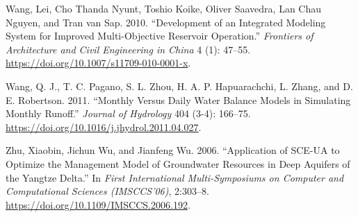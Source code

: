 \documentclass[
  letterpaper,
  DIV=11,
  numbers=noendperiod]{scrreprt}
\newlength{\cslhangindent}
\newlength{\cslentryspacingunit} %
\newenvironment{CSLReferences}[2] %
 {%
  \setlength{\parindent}{0pt}
  \ifodd #1
  \let\oldpar\par
  \def\par{\hangindent=\cslhangindent\oldpar}
  \fi
  \setlength{\parskip}{#2\cslentryspacingunit}
 }%
 {}
\begin{document}
\begin{CSLReferences}{1}{0}
\leavevmode{}%
Wang, Lei, Cho Thanda Nyunt, Toshio Koike, Oliver Saavedra, Lan Chau
Nguyen, and Tran van Sap. 2010. {``Development of an Integrated Modeling
System for Improved Multi-Objective Reservoir Operation.''}
\emph{Frontiers of Architecture and Civil Engineering in China} 4 (1):
47--55. \url{https://doi.org/10.1007/s11709-010-0001-x}.

\leavevmode{}%
Wang, Q. J., T. C. Pagano, S. L. Zhou, H. A. P. Hapuarachchi, L. Zhang,
and D. E. Robertson. 2011. {``Monthly Versus Daily Water Balance Models
in Simulating Monthly Runoff.''} \emph{Journal of Hydrology} 404 (3-4):
166--75. \url{https://doi.org/10.1016/j.jhydrol.2011.04.027}.

\leavevmode{}%
Zhu, Xiaobin, Jichun Wu, and Jianfeng Wu. 2006. {``Application of
{SCE}-{UA} to {Optimize} the {Management} {Model} of {Groundwater}
{Resources} in {Deep} {Aquifers} of the {Yangtze} {Delta}.''} In
\emph{First {International} {Multi}-{Symposiums} on {Computer} and
{Computational} {Sciences} ({IMSCCS}'06)}, 2:303--8.
\url{https://doi.org/10.1109/IMSCCS.2006.192}.

\end{CSLReferences}
\end{document}

